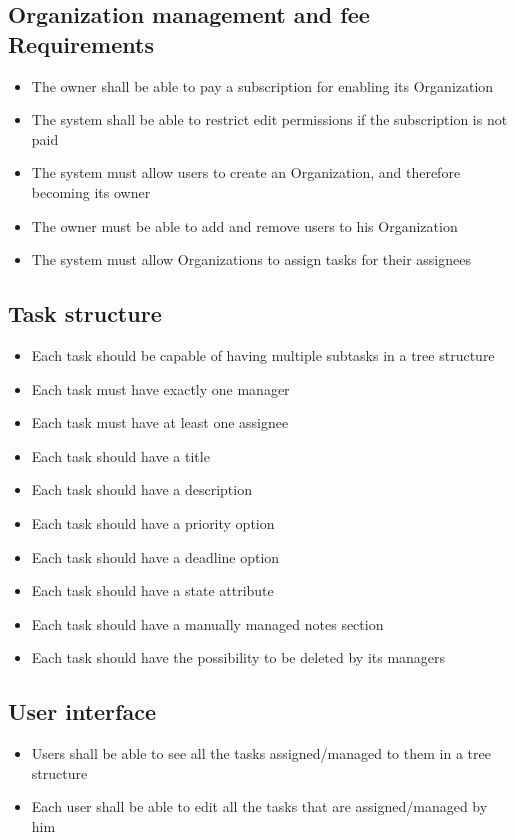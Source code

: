 \documentclass{article}
\begin{document}
\subsection{Organization management and fee Requirements}
\begin{itemize}
    \item The owner shall be able to pay a subscription for enabling its Organization
    \item The system shall be able to restrict edit permissions if the subscription is not paid
    \item The system must allow users to create an Organization, and therefore becoming its owner
    \item The owner must be able to add and remove users to his Organization
    \item The system must allow Organizations to assign tasks for their assignees
\end{itemize}
\subsection{Task structure}
\begin{itemize}
    \item Each task should be capable of having multiple subtasks in a tree structure
    \item Each task must have exactly one manager
    \item Each task must have at least one assignee
    \item Each task should have a title
    \item Each task should have a description
    \item Each task should have a priority option
    \item Each task should have a deadline option
    \item Each task should have a state attribute
    \item Each task should have a manually managed notes section
    \item Each task should have the possibility to be deleted by its managers
\end{itemize}
\subsection{User interface}
\begin{itemize}
    \item Users shall be able to see all the tasks assigned/managed to them in a tree structure
    \item Each user shall be able to edit all the tasks that are assigned/managed by him
\end{itemize}
\end{document}
